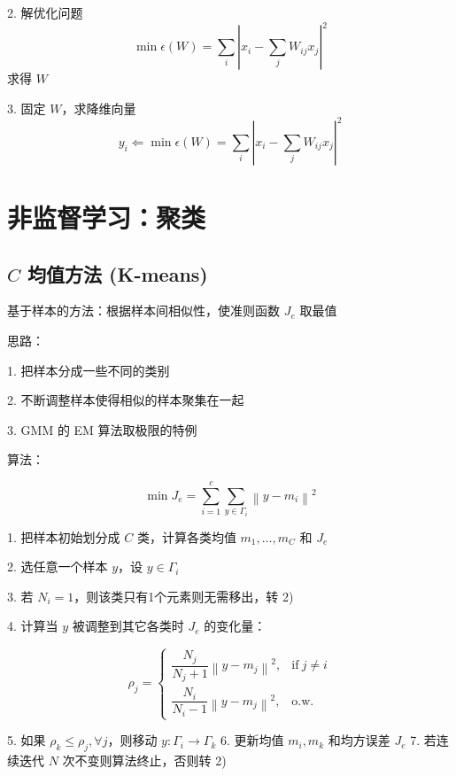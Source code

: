 \documentclass[openany,a4paper,12pt]{ctexbook}
\theoremstyle{kaiti}
\theoremstyle{normal}
\begin{document}
2. 解优化问题
   \begin{equation}
   \min \epsilon \left(W \right)=\sum_i\left|x_i-\sum_jW_{ij}x_j\right|^2
   \end{equation} 
   求得 $W$

3. 固定 $W$，求降维向量
  \begin{equation}
  y_i\Leftarrow \min \epsilon \left(W \right)=\sum_i\left|x_i-\sum_jW_{ij}x_j\right|^2
  \end{equation}

\chapter{非监督学习：聚类}

\section{\texorpdfstring{$C$}{C} 均值方法 (K-means)}

基于样本的方法：根据样本间相似性，使准则函数 $J_e$ 取最值

思路：

1. 把样本分成一些不同的类别

2. 不断调整样本使得相似的样本聚集在一起

3. GMM 的 EM 算法取极限的特例

算法：

\begin{equation}
\min J_e=\sum_{i=1}^c{\sum_{y\in \Gamma_i}^{}{\left\| y-m_i \right\|^2}}
\end{equation}

1. 把样本初始划分成 $C$ 类，计算各类均值 $m_1,\dots ,m_C$ 和 $J_e$

2. 选任意一个样本 $y$，设 $y\in \Gamma_i$

3. 若 $N_i=1$，则该类只有1个元素则无需移出，转 2)

4. 计算当 $y$ 被调整到其它各类时 $J_e$ 的变化量：

\begin{equation}
  \rho_j=
  \begin{cases}
    \dfrac{N_j}{N_j+1}\left\| y-m_j \right\|^2, &\mathrm{if}~j\ne i\\
    \dfrac{N_i}{N_i-1}\left\| y-m_j \right\|^2, &\mathrm{o}.\mathrm{w}.
  \end{cases}
\end{equation}

5. 如果 $\rho_k\leqslant \rho_j, \forall j$，则移动 $y:\Gamma_i\rightarrow \Gamma_k$
6. 更新均值 $m_i, m_k$ 和均方误差 $J_e$
7. 若连续迭代 $N$ 次不变则算法终止，否则转 2)
\end{document}
